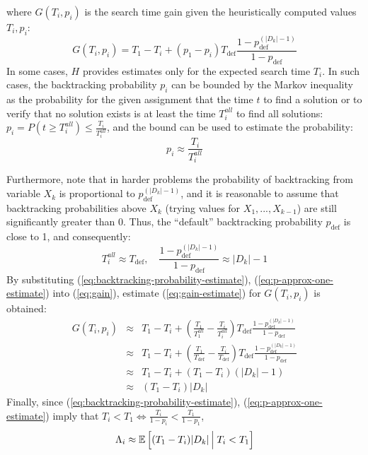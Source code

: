 where $G(T_i, p_i)$ is the search time gain given the heuristically computed values $T_i, p_i$:
\begin{equation}
\label{eq:gain}
G(T_i, p_i) = T_1-T_i+(p_1-p_i)T_\mathrm{def}\frac{1-p_\mathrm{def}^{(|D_k|-1)}}{1-p_\mathrm{def}}
\end{equation}
In some cases, $H$ provides estimates only for the expected
search time $T_i$. In such cases, the backtracking probability $p_i$
can be bounded by the Markov inequality as the probability for the
given assignment that the time $t$ to find a solution or to verify that
no solution exists is at least the time $T_i^{all}$ to find all
solutions: $p_i=P\left(t\ge T_i^{all}\right)\le \frac{T_i} {T_i^{all}}$, 
and the bound can be used to estimate the probability:
\begin{equation}
\label{eq:backtracking-probability-estimate}
p_i\approx\frac{T_i} {T_i^{all}}
\end{equation}

Furthermore, note that in harder problems  the probability of
backtracking from variable $X_k$ is proportional to $p_\mathrm{def}^{(|D_k|-1)}$, and it is
reasonable to assume that backtracking probabilities above $X_k$
(trying values for $X_1, ..., X_{k-1}$)  are still significantly greater than 0.
Thus, the ``default'' backtracking
probability $p_\mathrm{def}$ is close to 1, and consequently:
\begin{equation}
  \label{eq:p-approx-one-estimate}
T_i^{all} \approx T_\mathrm{def},\quad\frac{1-p_\mathrm{def}^{(|D_k|-1)}}{1-p_\mathrm{def}} \approx |D_k|-1
\end{equation}
By substituting (\ref{eq:backtracking-probability-estimate}),
(\ref{eq:p-approx-one-estimate}) into (\ref{eq:gain}),
estimate (\ref{eq:gain-estimate}) for $G(T_i, p_i)$ is obtained:
\begin{eqnarray}
\label{eq:gain-estimate}
G(T_i, p_i)&\approx&T_1-T_i+(\frac {T_1} {T_1^{all}}-\frac {T_i} {T_i^{all}})T_\mathrm{def}\frac{1-p_\mathrm{def}^{(|D_k|-1)}}{1-p_\mathrm{def}}\nonumber\\
           &\approx&T_1-T_i+(\frac {T_1} {T_\mathrm{def}}-\frac {T_i} {T_\mathrm{def}})T_\mathrm{def}\frac{1-p_\mathrm{def}^{(|D_k|-1)}}{1-p_\mathrm{def}}\nonumber\\
           &\approx&T_1-T_i+(T_1-T_i)(|D_k|-1)\nonumber\\
           &\approx&(T_1-T_i)|D_k|
\end{eqnarray}
Finally, since (\ref{eq:backtracking-probability-estimate}), (\ref{eq:p-approx-one-estimate}) imply that $T_i<T_1 \Leftrightarrow \frac {T_i} {1-p_i} < \frac {T_1} {1-p_1}$, 
\begin{eqnarray}
\label{eq:benefit-superestimate}
\Lambda_i\approx\mathbb{E}\left[(T_1-T_i)|D_k|\,\Big|\; T_i<T_1 \right]
\end{eqnarray}


